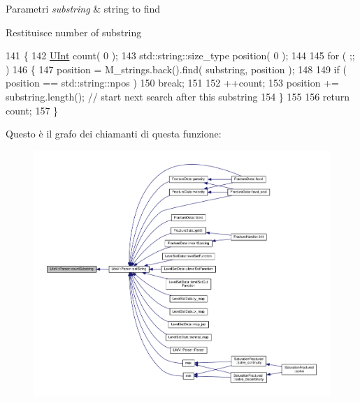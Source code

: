 \begin{DoxyParams}{Parametri}
{\em substring} & string to find \\
\hline
\end{DoxyParams}
\begin{DoxyReturn}{Restituisce}
number of substring 
\end{DoxyReturn}

\begin{DoxyCode}
141 \{
142     \hyperlink{namespaceLifeV_a4bd093cf6b0d5b57b2d89e0e90d610b7}{UInt} count( 0 );
143     std::string::size\_type position( 0 );
144 
145     \textcolor{keywordflow}{for} ( ;; )
146     \{
147         position = M\_strings.back().find( substring, position );
148 
149         \textcolor{keywordflow}{if} ( position == std::string::npos )
150             \textcolor{keywordflow}{break};
151 
152         ++count;
153         position += substring.length(); \textcolor{comment}{// start next search after this substring}
154     \}
155 
156     \textcolor{keywordflow}{return} count;
157 \}
\end{DoxyCode}


Questo è il grafo dei chiamanti di questa funzione\-:
\nopagebreak
\begin{figure}[H]
\begin{center}
\leavevmode
\includegraphics[width=350pt]{classLifeV_1_1Parser_a37ae3af9abcf72ca8e1537ec771b523a_icgraph}
\end{center}
\end{figure}


